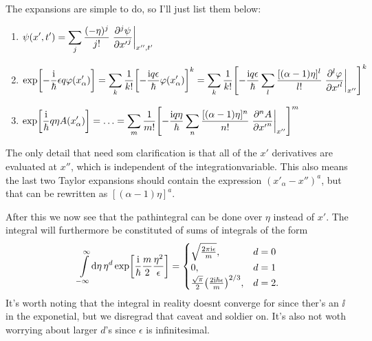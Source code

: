 \documentclass[11pt,letter, swedish, english
]{article}
\begin{document}
The expansions are simple to do, so I'll just list them below:
\begin{enumerate}[label=(\Roman*)]
\item $\displaystyle
\psi(x', t')=\sum_{j}  \frac{(-\eta)^j}{j!}\eval{\pdv[j]{\psi}{{x'}}}_{x'', t'}
$
\item $\displaystyle
\exp[-\frac{\ii}{\hbar}\epsilon q\varphi(x'_\alpha)]
=\sum_k \frac{1}{k!} 
\qty[-\frac{\ii q\epsilon}{\hbar} \varphi(x'_\alpha)]^k
=\sum_k \frac{1}{k!} 
\qty[-\frac{\ii q\epsilon}{\hbar} 
\sum_l \frac{[(\alpha-1)\eta]^l}{l!}\eval{\pdv[l]{\varphi}{{x'}}}_{x''}
]^k
$
\item $\displaystyle
\exp[\frac{\ii}{\hbar} q\eta A(x'_\alpha)]=\ldots
=\sum_m \frac{1}{m!} 
\qty[-\frac{\ii q\eta}{\hbar} 
\sum_n \frac{[(\alpha-1)\eta]^n}{n!}\eval{\pdv[n]{A}{{x'}}}_{x''}
]^m
$
\end{enumerate}
The only detail that need som clarification is that all of the $x'$
derivatives are evaluated at $x''$, which is independent of the
integrationvariable. This also means the last two Taylor expansions
should contain the expression $(x'_\alpha-x'')^a$, but that can be
rewritten as $[(\alpha-1)\eta]^a$.

After this we now see that the pathintegral can be done over $\eta$
instead of $x'$.
The integral will furthermore be constituted of sums of integrals of
the form 
\begin{equation}\label{eq:4_int_form}
\int_{-\infty}^{\infty}\!\rd{\eta}\,\eta^d
\exp[\frac{\ii}{\hbar}\frac{m}{2}\frac{\eta^2}{\epsilon}]
=\begin{cases}
\sqrt{\frac{2\pi\ii\epsilon}{m}},&d=0\\
0,&d=1\\
\frac{\sqrt{\pi}}{2}\qty(\frac{2\ii\hbar\epsilon}{m})^{2/3},&d=2.
\end{cases}
\end{equation}
It's worth noting that the integral in reality doesnt converge for
since ther's an $\ii$ in the exponetial, but we disregrad that
caveat and soldier on. It's also not woth worrying about larger $d$'s
since $\epsilon$ is infinitesimal. 
\end{document}
